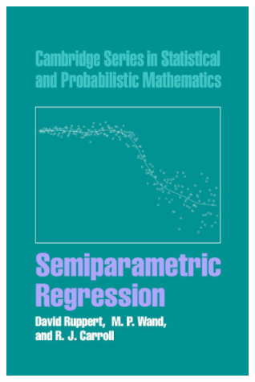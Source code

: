 \documentclass[pdf]{beamer}\usepackage[]{graphicx}\usepackage[]{color}
\begin{document}
\begin{frame}
\begin{columns}
\begin{center}
\includegraphics[width=0.6\textwidth]{img/cover_semiparametriRegression.png}
\end{center}
\end{columns}

\end{frame}
\end{document}
